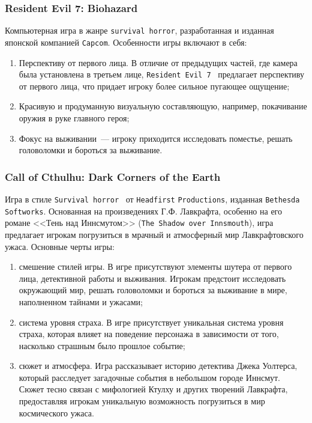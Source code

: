 \subsubsection{Resident Evil 7: Biohazard}

Компьютерная игра в жанре \texttt{survival horror}, разработанная и изданная японской компанией \texttt{Capcom}. Особенности игры включают в себя:
\begin{enumerate}
\item  Перспективу от первого лица. В отличие от предыдущих частей, где камера была установлена в третьем лице, \texttt{Resident Evil 7}~\cite{enwiki:1188461634} предлагает перспективу от первого лица, что придает игроку более сильное пугающее ощущение;
\item  Красивую и продуманную визуальную составляющую, например, покачивание оружия в руке главного героя;
\item  Фокус на выживании~--- игроку приходится исследовать поместье, решать головоломки и бороться за выживание.
\end{enumerate}

\subsubsection{Call of Cthulhu: Dark Corners of the Earth}

Игра в стиле \texttt{Survival horror}~\cite{enwiki:1182890909} от \texttt{Headfirst} \texttt{Productions}, изданная \texttt{Bethesda Softworks}. Основанная на произведениях Г.Ф. Лавкрафта, особенно на его романе <<Тень над Иннсмутом>> (\texttt{The Shadow over Innsmouth}), игра предлагает игрокам погрузиться в мрачный и атмосферный мир Лавкрафтовского ужаса. Основные черты игры:
\begin{enumerate}
\item  смешение стилей игры. В игре присутствуют элементы шутера от первого лица, детективной работы и выживания. Игрокам предстоит исследовать окружающий мир, решать головоломки и бороться за выживание в мире, наполненном тайнами и ужасами;
\item  система уровня страха. В игре присутствует уникальная система уровня страха, которая влияет на поведение персонажа в зависимости от того, насколько страшным было прошлое событие;
\item  сюжет и атмосфера. Игра рассказывает историю детектива Джека Уолтерса, который расследует загадочные события в небольшом городе Иннсмут. Сюжет тесно связан с мифологией Ктулху и других творений Лавкрафта, предоставляя игрокам уникальную возможность погрузиться в мир космического ужаса.
\end{enumerate}

